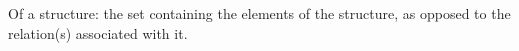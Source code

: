 Of a structure: the set containing the elements of the
structure, as opposed to the relation(s) associated
with it.

